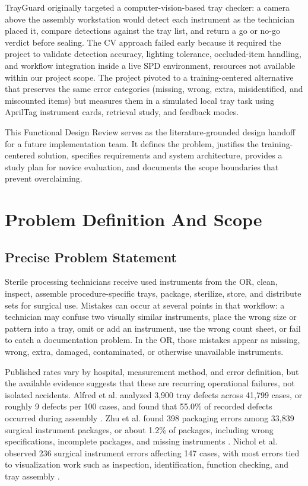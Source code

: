 \documentclass[10pt,a4paper]{article}
\begin{document}
TrayGuard originally targeted a computer-vision-based tray checker: a camera
above the assembly workstation would detect each instrument as the technician
placed it, compare detections against the tray list, and return a go or no-go
verdict before sealing. The CV approach failed early because it required the
project to validate detection accuracy, lighting tolerance, occluded-item
handling, and workflow integration inside a live SPD environment, resources
not available within our project scope. The project pivoted to a training-centered
alternative that preserves the same error categories (missing, wrong, extra,
misidentified, and miscounted items) but measures them in a simulated local tray
task using AprilTag instrument cards, retrieval study, and feedback modes.

This Functional Design Review serves as the literature-grounded design handoff
for a future implementation team. It defines the problem, justifies the
training-centered solution, specifies requirements and system architecture,
provides a study plan for novice evaluation, and documents the scope boundaries
that prevent overclaiming.


\section{Problem Definition And Scope}
\label{sec:problem-definition-and-scope}
\subsection{Precise Problem Statement}
\label{sec:precise-problem-statement}

Sterile processing technicians receive used instruments from the OR, clean,
inspect, assemble procedure-specific trays, package, sterilize, store, and
distribute sets for surgical use. Mistakes can occur at several points in that
workflow: a technician may confuse two visually similar instruments, place the
wrong size or pattern into a tray, omit or add an instrument, use the wrong
count sheet, or fail to catch a documentation problem. In the OR, those
mistakes appear as missing, wrong, extra, damaged, contaminated, or otherwise
unavailable instruments.

Published rates vary by hospital, measurement method, and error definition, but
the available evidence suggests that these are recurring operational failures,
not isolated accidents. Alfred et al. analyzed 3,900 tray defects across 41,799
cases, or roughly 9 defects per 100 cases, and found that 55.0\% of recorded
defects occurred during assembly
\cite{alfred-et-al-2021}. Zhu et al. found
398 packaging errors among 33,839 surgical instrument packages, or about 1.2\%
of packages, including wrong specifications, incomplete packages, and missing
instruments \cite{zhu-et-al-2019}. Nichol et al.
observed 236 surgical instrument errors affecting 147 cases, with most errors
tied to visualization work such as inspection, identification, function
checking, and tray assembly
\cite{nichol-et-al-2024}.
\end{document}
